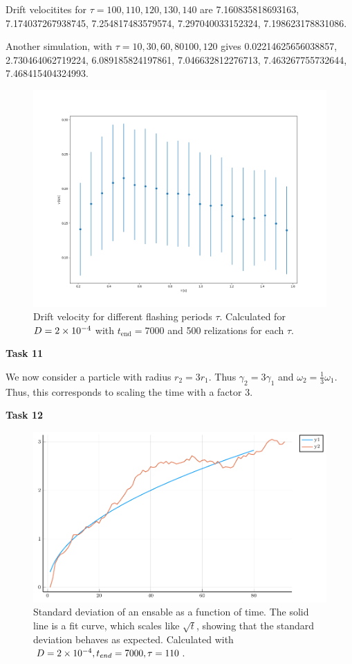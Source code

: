 \documentclass[a4paper, 12pt]{article}
\begin{document}
Drift velocitites for $\tau = 100, 110, 120, 130, 140$ are 7.160835818693163, 7.174037267938745, 7.254817483579574, 7.297040033152324, 7.198623178831086.

Another simulation, with $\tau = 10, 30, 60, 80 100, 120$ gives 0.02214625656038857, 2.730464062719224, 6.089185824197861, 7.046632812276713, 7.463267755732644, 7.468415404324993.

\begin{figure}
  \centering
  \includegraphics[width=.75\textwidth]{media/drift_velocity}
  \caption{Drift velocity for different flashing periods $\tau$.
    Calculated for $D=\num{2E-4}$ with $t_{\text{end}} = 7000$ and 500 relizations for each $\tau$.
    \label{fig:drift_velocity}}
\end{figure}


\textbf{Task 11}

We now consider a particle with radius $r_2 = 3r_1$.
Thus $\gamma_2 = 3\gamma_1$ and $\omega_2 = \frac{1}{3} \omega_1$.
Thus, this corresponds to scaling the time with a factor 3.

\textbf{Task 12}


\begin{figure}
  \centering
  \includegraphics[width=.75\textwidth]{media/diffusion_std}
  \caption{Standard deviation of an ensable as a function of time. The solid line is a fit curve, which scales like $\sqrt{t}$, showing that the standard deviation behaves as expected.
  Calculated with $D = \num{2E-4}, t_{end} = 7000, \tau=110$.}

\end{figure}
\end{document}
